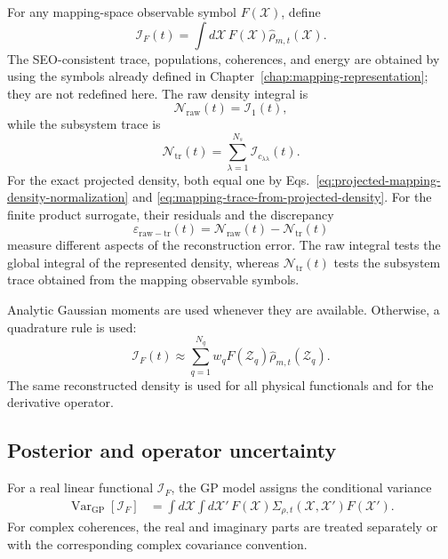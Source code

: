\documentclass[
  11pt,
  letterpaper,
  onehalfspacing,
  normalmargins,
  equalmargins,
  oneside
]{ut-thesis}
\begin{document}
For any mapping-space observable symbol
\(F(\boldsymbol{\mathcal X})\), define
\begin{equation}
\mathcal I_F(t)
=
\int d\boldsymbol{\mathcal X}\,
F(\boldsymbol{\mathcal X})
\widehat{\rho}_{m,t}(\boldsymbol{\mathcal X}).
\label{eq:gp-linear-functional}
\end{equation}
The SEO-consistent trace, populations, coherences, and energy are obtained by
using the symbols already defined in
Chapter~\ref{chap:mapping-representation}; they are not redefined here. The
raw density integral is
\begin{equation}
\mathcal N_{\mathrm{raw}}(t)
=
\mathcal I_1(t),
\label{eq:gp-raw-density-integral}
\end{equation}
while the subsystem trace is
\begin{equation}
\mathcal N_{\mathrm{tr}}(t)
=
\sum_{\lambda=1}^{N_s}
\mathcal I_{c_{\lambda\lambda}}(t).
\label{eq:gp-subsystem-trace}
\end{equation}
For the exact projected density, both equal one by
Eqs.~\eqref{eq:projected-mapping-density-normalization} and
\eqref{eq:mapping-trace-from-projected-density}. For the finite product
surrogate, their residuals and the discrepancy
\begin{equation}
\varepsilon_{\mathrm{raw-tr}}(t)
=
\mathcal N_{\mathrm{raw}}(t)-
\mathcal N_{\mathrm{tr}}(t)
\label{eq:gp-normalization-trace-discrepancy}
\end{equation}
measure different aspects of the reconstruction error. The raw integral tests
the global integral of the represented density, whereas
\(\mathcal N_{\mathrm{tr}}(t)\) tests the subsystem trace obtained from the mapping
observable symbols.

Analytic Gaussian moments are used whenever they are available. Otherwise, a
quadrature rule is used:
\begin{equation}
\mathcal I_F(t)
\approx
\sum_{q=1}^{N_q}
 w_q
 F(\boldsymbol{\mathcal Z}_q)
\widehat{\rho}_{m,t}(\boldsymbol{\mathcal Z}_q).
\label{eq:gp-functional-quadrature}
\end{equation}
The same reconstructed density is used for all physical functionals and for
the derivative operator.


\subsection{Posterior and operator uncertainty}
\label{subsec:gp-operator-uncertainty}

For a real linear functional \(\mathcal I_F\), the GP model assigns the
conditional variance
\begin{align}
\operatorname{Var}_{\mathrm{GP}}[\mathcal I_F]
&=
\int d\boldsymbol{\mathcal X}
\int d\boldsymbol{\mathcal X}'\,
F(\boldsymbol{\mathcal X})
\Sigma_{\rho,t}
\left(
\boldsymbol{\mathcal X},
\boldsymbol{\mathcal X}'
\right)
F(\boldsymbol{\mathcal X}').
\label{eq:gp-functional-variance}
\end{align}
For complex coherences, the real and imaginary parts are treated separately or
with the corresponding complex covariance convention.
\end{document}
